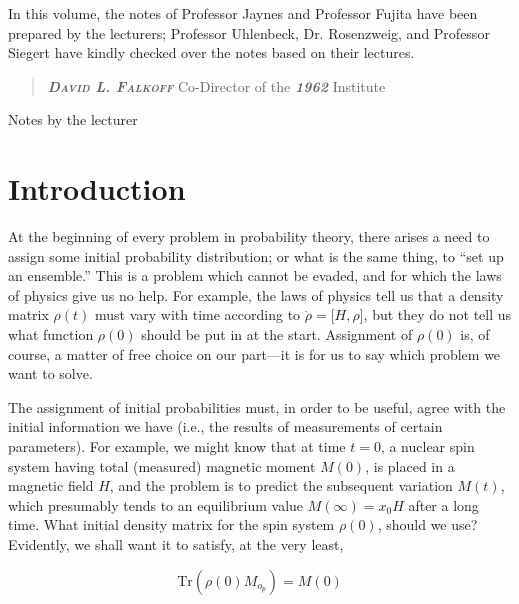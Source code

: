 \documentclass[]{article}
\begin{document}
In this volume, the notes of Professor Jaynes and Professor Fujita have
been prepared by the lecturers; Professor Uhlenbeck, Dr. Rosenzweig, and
Professor Siegert have kindly checked over the notes based on their
lectures.

\begin{quote}
\emph{\textbf{\textsc{David L. Falkoff}}} Co-Director of the
\emph{\textbf{1962}} Institute
\end{quote}

\maketitle 

Notes by the lecturer

\tableofcontents

\section{Introduction}\label{introduction}

At the beginning of every problem in probability theory, there arises a
need to assign some initial probability distribution; or what is the
same thing, to ``set up an ensemble.'' This is a problem which cannot be
evaded, and for which the laws of physics give us no help. For example,
the laws of physics tell us that a density matrix
\(\rho\left( t \right)\) must vary with time according to
\(\dot{\rho} = \lbrack H,\rho\rbrack\), but they do not
tell us what function \(\rho(0)\) should be put in at the start.
Assignment of \(\rho(0)\) is, of course, a matter of free choice on our
part---it is for us to say which problem we want to solve.

The assignment of initial probabilities must, in order to be useful,
agree with the initial information we have (i.e., the results of
measurements of certain parameters). For example, we might know that at
time \(t = 0\), a nuclear spin system having total (measured) magnetic
moment \(M(0)\), is placed in a magnetic field \(H\), and the problem is
to predict the subsequent variation \(M(t)\), which presumably tends to
an equilibrium value \(M\left( \infty \right) = x_{0}H\) after a long
time. What initial density matrix for the spin system \(\rho(0)\),
should we use? Evidently, we shall want it to satisfy, at the very
least,

\begin{equation}
\text{Tr}\left( \rho(0)M_{o_{p}} \right) = M(0) \label{eqn-one}
\end{equation}
\end{document}
